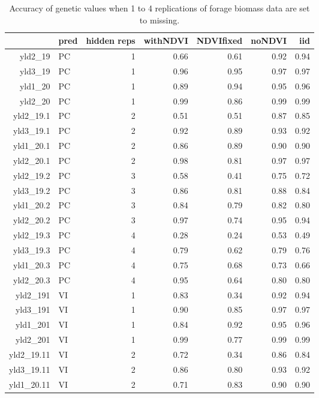 \documentclass[12pt, letterpaper]{article}
\begin{document}
\begin{table}[ht]
\caption{Accuracy of genetic values when 1 to 4 replications of forage biomass data are set to missing. }
\centering
\begin{tabular}{rlrrrrr}
  \hline
 & pred & hidden reps & withNDVI & NDVIfixed & noNDVI & iid \\ 
  \hline
yld2\_19 & PC &   1 & 0.66 & 0.61 & 0.92 & 0.94 \\ 
  yld3\_19 & PC &   1 & 0.96 & 0.95 & 0.97 & 0.97 \\ 
  yld1\_20 & PC &   1 & 0.89 & 0.94 & 0.95 & 0.96 \\ 
  yld2\_20 & PC &   1 & 0.99 & 0.86 & 0.99 & 0.99 \\ 
  yld2\_19.1 & PC &   2 & 0.51 & 0.51 & 0.87 & 0.85 \\ 
  yld3\_19.1 & PC &   2 & 0.92 & 0.89 & 0.93 & 0.92 \\ 
  yld1\_20.1 & PC &   2 & 0.86 & 0.89 & 0.90 & 0.90 \\ 
  yld2\_20.1 & PC &   2 & 0.98 & 0.81 & 0.97 & 0.97 \\ 
  yld2\_19.2 & PC &   3 & 0.58 & 0.41 & 0.75 & 0.72 \\ 
  yld3\_19.2 & PC &   3 & 0.86 & 0.81 & 0.88 & 0.84 \\ 
  yld1\_20.2 & PC &   3 & 0.84 & 0.79 & 0.82 & 0.80 \\ 
  yld2\_20.2 & PC &   3 & 0.97 & 0.74 & 0.95 & 0.94 \\ 
  yld2\_19.3 & PC &   4 & 0.28 & 0.24 & 0.53 & 0.49 \\ 
  yld3\_19.3 & PC &   4 & 0.79 & 0.62 & 0.79 & 0.76 \\ 
  yld1\_20.3 & PC &   4 & 0.75 & 0.68 & 0.73 & 0.66 \\ 
  yld2\_20.3 & PC &   4 & 0.95 & 0.64 & 0.80 & 0.80 \\ 
  yld2\_191 & VI &   1 & 0.83 & 0.34 & 0.92 & 0.94 \\ 
  yld3\_191 & VI &   1 & 0.90 & 0.85 & 0.97 & 0.97 \\ 
  yld1\_201 & VI &   1 & 0.84 & 0.92 & 0.95 & 0.96 \\ 
  yld2\_201 & VI &   1 & 0.99 & 0.77 & 0.99 & 0.99 \\ 
  yld2\_19.11 & VI &   2 & 0.72 & 0.34 & 0.86 & 0.84 \\ 
  yld3\_19.11 & VI &   2 & 0.86 & 0.80 & 0.93 & 0.92 \\ 
  yld1\_20.11 & VI &   2 & 0.71 & 0.83 & 0.90 & 0.90 \\ 

\end{tabular}
\end{table}
\end{document}
